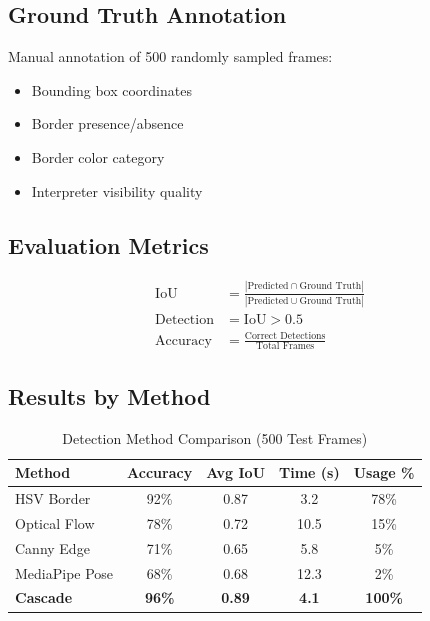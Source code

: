 \documentclass[11pt,a4paper]{article}
\begin{document}
\subsection{Ground Truth Annotation}

Manual annotation of 500 randomly sampled frames:
\begin{itemize}
    \item Bounding box coordinates
    \item Border presence/absence
    \item Border color category
    \item Interpreter visibility quality
\end{itemize}

\subsection{Evaluation Metrics}

\begin{align}
\text{IoU} &= \frac{|\text{Predicted} \cap \text{Ground Truth}|}{|\text{Predicted} \cup \text{Ground Truth}|} \\
\text{Detection} &= \text{IoU} > 0.5 \\
\text{Accuracy} &= \frac{\text{Correct Detections}}{\text{Total Frames}}
\end{align}

\subsection{Results by Method}

\begin{table}[htbp]
\centering
\caption{Detection Method Comparison (500 Test Frames)}
\begin{tabular}{@{}lcccc@{}}
\toprule
\textbf{Method} & \textbf{Accuracy} & \textbf{Avg IoU} & \textbf{Time (s)} & \textbf{Usage \%} \\ \midrule
HSV Border & 92\% & 0.87 & 3.2 & 78\% \\
Optical Flow & 78\% & 0.72 & 10.5 & 15\% \\
Canny Edge & 71\% & 0.65 & 5.8 & 5\% \\
MediaPipe Pose & 68\% & 0.68 & 12.3 & 2\% \\
\textbf{Cascade} & \textbf{96\%} & \textbf{0.89} & \textbf{4.1} & \textbf{100\%} \\
\bottomrule
\end{tabular}
\end{table}
\end{document}
